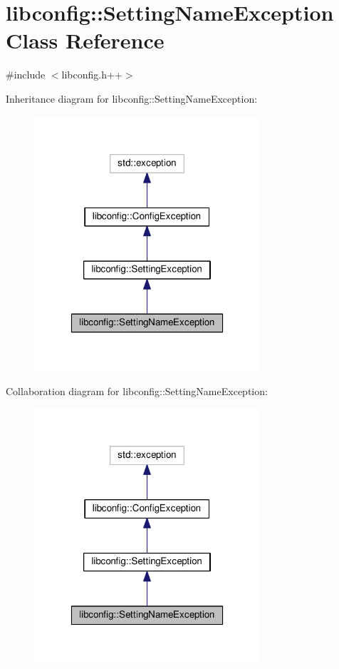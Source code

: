 \hypertarget{classlibconfig_1_1SettingNameException}{\section{libconfig\-:\-:Setting\-Name\-Exception Class Reference}
\label{classlibconfig_1_1SettingNameException}
}


{\ttfamily \#include $<$libconfig.\-h++$>$}



Inheritance diagram for libconfig\-:\-:Setting\-Name\-Exception\-:\nopagebreak
\begin{figure}[H]
\begin{center}
\leavevmode
\includegraphics[width=238pt]{classlibconfig_1_1SettingNameException__inherit__graph}
\end{center}
\end{figure}


Collaboration diagram for libconfig\-:\-:Setting\-Name\-Exception\-:\nopagebreak
\begin{figure}[H]
\begin{center}
\leavevmode
\includegraphics[width=238pt]{classlibconfig_1_1SettingNameException__coll__graph}
\end{center}
\end{figure}
